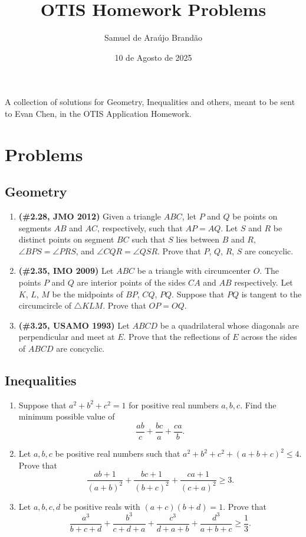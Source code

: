 \documentclass[12pt]{article}
\title{\sffamily\bfseries{OTIS Homework Problems}}
\author{Samuel de Araújo Brandão}
\date{10 de Agosto de 2025}
\begin{document}
  \maketitle

  A collection of solutions for Geometry, Inequalities and others, meant to be sent to Evan Chen, in the OTIS Application Homework.

  \tableofcontents
  
  \clearpage
  
  \section{\textsf{Problems}}
    \subsection{Geometry}
      \begin{enumerate}[label=\textbf{\arabic*.}]
        \item \textbf{(\#2.28, JMO 2012)} Given a triangle $ABC$, let $P$ and $Q$ be points on segments $AB$ and $AC$, respectively, such
          that $AP = AQ$. Let $S$ and $R$ be distinct points on segment $BC$ such that $S$ lies between $B$ and $R$, $\angle BPS = \angle PRS$,
          and $\angle CQR = \angle QSR$. Prove that $P$, $Q$, $R$, $S$ are concyclic.

        \item \textbf{(\#2.35, IMO 2009)} Let $ABC$ be a triangle with circumcenter $O$. The points $P$ and $Q$ are interior points of the sides $CA$
          and $AB$ respectively. Let $K$, $L$, $M$ be the midpoints of $BP$, $CQ$, $PQ$. Suppose that $PQ$ is tangent to the circumcircle 
          of $\triangle KLM$. Prove that $OP = OQ$.

        \item \textbf{(\#3.25, USAMO 1993)} Let $ABCD$ be a quadrilateral whose diagonals are perpendicular and meet at $E$. Prove that the reflections
          of $E$ across the sides of $ABCD$ are concyclic.
      \end{enumerate}

    \subsection{Inequalities}
      \begin{enumerate}[label=\textbf{\arabic*.}]
        \item Suppose that $a^2 + b^2 + c^2 = 1$ for positive real numbers $a, b, c$. Find the minimum possible value of
          \[
            \frac{ab}{c} + \frac{bc}{a} + \frac{ca}{b}.
          \]
        \item Let $a, b, c$ be positive real numbers such that $a^2 + b^2 + c^2 + (a+b+c)^2 \le 4$. Prove that
          \[
            \frac{ab + 1}{(a+b)^2} + \frac{bc + 1}{(b+c)^2} + \frac{ca + 1}{(c+a)^2} \ge 3.
          \]
        \item Let $a, b, c, d$ be positive reals with $(a+c)(b+d) = 1$. Prove that
          \[
            \frac{a^3}{b+c+d} + \frac{b^3}{c+d+a} + \frac{c^3}{d+a+b} + \frac{d^3}{a+b+c} \ge \frac13.
          \]
      \end{enumerate}
\end{document}
